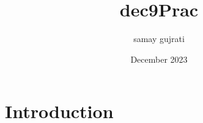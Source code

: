 \documentclass{article}
\title{dec9Prac}
\author{samay gujrati}
\date{December 2023}
\begin{document}
\maketitle

\section{Introduction}
\end{document}
